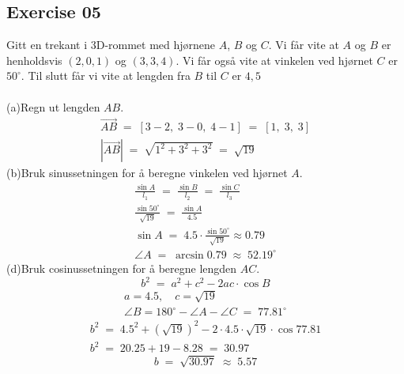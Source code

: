 \documentclass[12pt, a4paper]{article}
\begin{document}
\subsection*{Exercise 05}
Gitt en trekant i 3D-rommet med hjørnene
$A$, $B$ og $C$. Vi får vite at $A$ og $B$ er henholdsvis $(2, 0, 1)$ og $(3, 3, 4)$. Vi får også
vite at vinkelen ved hjørnet $C$ er $50^\circ$. Til slutt får vi vite at lengden fra $B$ til $C$ er 
$4,5$\\\\
	(a)\quad Regn ut lengden $AB$.
			\begin{gather}
				\tag*{}
					\vec{AB}\;=\;[
						3-2,\;3-0,\;4-1
					]\;=\;[1,\;3,\;3]\\
				\tag*{}
					\left|\vec{AB}\right|\;=\;
					\sqrt{1^2+3^2+3^2}\;=\;\sqrt{19}
			\end{gather}
	(b)\quad Bruk sinussetningen for å beregne vinkelen
	ved hjørnet $A$.
			\begin{gather}
				\tag*{}
					\frac{\sin{A}}{l_1}\;=\;
					\frac{\sin{B}}{l_2}\;=\;
					\frac{\sin{C}}{l_3}\\
				\tag*{}
					\frac{\sin{50^\circ}}{\sqrt{19}}\;=\;
					\frac{\sin{A}}{4.5}\\
				\tag*{}
					\sin{A}\;=\;4.5\cdot
					\frac{\sin{50^\circ}}{\sqrt{19}}
					\approx0.79\\
				\tag*{}
					\angle{A}\;=\;\arcsin{0.79}
					\;\approx\;52.19^\circ
			\end{gather}
	(d)\quad Bruk cosinussetningen for å beregne
	lengden $AC$.
			\begin{equation}
				\tag*{}
					b^2\;=\;a^2+c^2-2ac\cdot\cos{B}
			\end{equation}
			\begin{gather}
				\tag*{}
					a=4.5,\quad c=\sqrt{19}\\
				\tag*{}
					\angle{B}=180^\circ-\angle{A}-\angle{C}
					\;=\;77.81^\circ
			\end{gather}
			\begin{gather}
				\tag*{}
					b^2\;=\;4.5^2+\left(\sqrt{19}\right)^2
						-2\cdot4.5\cdot\sqrt{19}
						\cdot\cos{77.81}\\
				\tag*{}
					b^2\;=\;20.25+19-8.28\;=\;30.97					
			\end{gather}
			\begin{equation}
				\tag*{}
					b\;=\;\sqrt{30.97}\;\approx\;5.57
			\end{equation}
\newpage\quad
\end{document}
